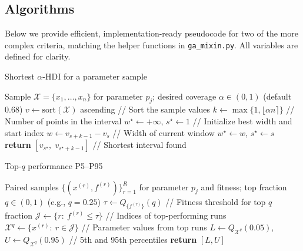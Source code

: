\documentclass[12pt,a4paper]{article}
\begin{document}
\subsection{Algorithms}
Below we provide efficient, implementation-ready pseudocode for two of the more complex criteria, matching the helper functions in \texttt{ga\_mixin.py}. All variables are defined for clarity.

\begin{algorithm}[H]
\caption{Shortest $\alpha$-HDI for a parameter sample}
\begin{algorithmic}[1]
\REQUIRE Sample $\mathcal{X}=\{x_1,\dots,x_n\}$ for parameter $p_j$; desired coverage $\alpha\in(0,1)$ (default $0.68$)
\STATE $v \leftarrow \mathrm{sort}(\mathcal{X})$ ascending \hfill // Sort the sample values
\STATE $k \leftarrow \max\{1, \lfloor \alpha n \rceil\}$ \hfill // Number of points in the interval
\STATE $w^\star \leftarrow +\infty$, $s^\star \leftarrow 1$ \hfill // Initialize best width and start index
    \STATE $w \leftarrow v_{s+k-1} - v_s$ \hfill // Width of current window
     $w^\star\leftarrow w$, $s^\star\leftarrow s$ \ENDIF
\ENDFOR
\STATE \textbf{return} $[v_{s^\star},\; v_{s^\star+k-1}]$ \hfill // Shortest interval found
\end{algorithmic}
\end{algorithm}

\begin{algorithm}[H]
\caption{Top-$q$ performance P5--P95}
\begin{algorithmic}[1]
\REQUIRE Paired samples $\{(x^{(r)}, f^{(r)})\}_{r=1}^R$ for parameter $p_j$ and fitness; top fraction $q\in(0,1)$ (e.g., $q=0.25$)
\STATE $\tau \leftarrow Q_{\{f^{(r)}\}}(q)$ \hfill // Fitness threshold for top $q$ fraction
\STATE $\mathcal{J} \leftarrow \{ r:\ f^{(r)} \le \tau \}$ \hfill // Indices of top-performing runs
\STATE $\mathcal{X}^{q} \leftarrow \{ x^{(r)}:\ r\in\mathcal{J}\}$ \hfill // Parameter values from top runs
\STATE $L \leftarrow Q_{\mathcal{X}^{q}}(0.05)$, $U \leftarrow Q_{\mathcal{X}^{q}}(0.95)$ \hfill // 5th and 95th percentiles
\STATE \textbf{return} $[L, U]$
\end{algorithmic}
\end{algorithm}
\end{document}
